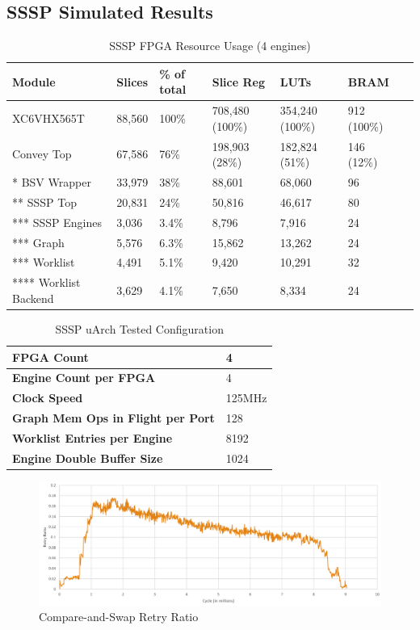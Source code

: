 \subsection{SSSP Simulated Results}


\begin{table}
\centering
\begin{tabular}{ | l | l l | l | l | l | l |}
  \hline
  \textbf{Module} & \textbf{Slices} & \textbf{\% of total} & \textbf{Slice Reg}  & \textbf{LUTs}  & \textbf{BRAM} \\
  \hline
  XC6VHX565T & 88,560 & 100\% & 708,480 (100\%) & 354,240 (100\%) & 912 (100\%)\\
  \hline
  Convey Top & 67,586 & 76\% & 198,903 (28\%) & 182,824 (51\%) & 146 (12\%)\\
  \hline
  * BSV Wrapper & 33,979 & 38\% & 88,601 & 68,060 & 96 \\
  \hline
  ** SSSP Top & 20,831 & 24\% & 50,816 & 46,617 & 80 \\
  \hline
  *** SSSP Engines & 3,036 & 3.4\% & 8,796 & 7,916 & 24 \\
  \hline
  *** Graph & 5,576 & 6.3\% & 15,862 & 13,262 & 24 \\
  \hline
  *** Worklist & 4,491 & 5.1\% & 9,420 & 10,291 & 32 \\
  \hline
  **** Worklist Backend & 3,629 & 4.1\% & 7,650 & 8,334 & 24 \\
  \hline
\end{tabular}
\caption{SSSP FPGA Resource Usage (4 engines)}
\label{table:ssspResourceUsage}
\end{table}

\begin{table}
\centering
\begin{tabular}{ | l | l |}
  \hline
  \textbf{FPGA Count} & 4\\
  \hline
  \textbf{Engine Count per FPGA} & 4\\
  \hline
  \textbf{Clock Speed} & 125MHz\\
  \hline
  \textbf{Graph Mem Ops in Flight per Port} & 128\\
  \hline
  \textbf{Worklist Entries per Engine} & 8192\\
  \hline
  \textbf{Engine Double Buffer Size} & 1024\\
  \hline
\end{tabular}
\caption{SSSP uArch Tested Configuration}
\label{table:ssspConfig}
\end{table}

\begin{figure}
\centering
\includegraphics[width=15cm, keepaspectratio]{pics/casretry.png}
\caption{Compare-and-Swap Retry Ratio}
\label{fig:casretry}
\end{figure}

